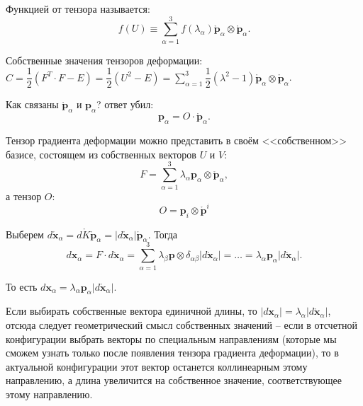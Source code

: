 \begin{definition}
  Функцией от тензора называется:
  \[
    f(U) \equiv \sum_{\alpha=1}^3 f(\lambda_\alpha) \mathring{\mathbf{p}}_\alpha \otimes \mathring{\mathbf{p}}_\alpha.
  \]
\end{definition}


Собственные значения тензоров деформации:
$C = \dfrac{1}{2} (F^T \cdot F - E) = \dfrac{1}{2} \left( U^2 - E \right) = \sum_{\alpha=1}^3 \dfrac{1}{2} (\lambda^2 - 1) \mathring{\mathbf{p}}_\alpha \otimes \mathring{\mathbf{p}}_\alpha$.

\begin{corollary}
  Как связаны $\mathring{\mathbf{p}}_\alpha$ и $\mathbf{p}_\alpha$? ответ убил:
  \[
    \mathbf{p}_\alpha = O \cdot \mathring{\mathbf{p}}_\alpha.
  \]

\end{corollary}

Тензор градиента деформации можно представить в своём <<собственном>> базисе, состоящем из
собственных векторов $U$ и $V$:
\[
  F = \sum_{\alpha=1}^3 \lambda_{\alpha} \mathbf{p}_\alpha \otimes \mathring{\mathbf{p}}_\alpha,
\]
а тензор $O$:
\[
  O = \mathbf{p}_i \otimes \mathring{\mathbf{p}}^i
\]

\begin{corollary}
  Выберем $d\mathring{\mathbf{x}}_\alpha = d\mathring{K} \mathring{\mathbf{p}}_\alpha = |d\mathring{\mathbf{x}}_\alpha| \mathring{\mathbf{p}}_\alpha$. Тогда
  \[
    d\mathbf{x}_\alpha = F \cdot d\mathring{\mathbf{x}}_\alpha = \sum_{\alpha=1}^3 \lambda_\beta \mathbf{p} \otimes \delta_{\alpha\beta} |d\mathring{\mathbf{x}}_\alpha| = \dots = \lambda_\alpha \mathbf{p}_\alpha |d\mathring{\mathbf{x}}_\alpha|.
  \]

  То есть $d\mathbf{x}_\alpha = \lambda_\alpha \mathbf{p}_\alpha |d\mathring{\mathbf{x}}_\alpha|$.

  Если выбирать собственные вектора единичной длины, то $|d\mathbf{x}_\alpha| = \lambda_\alpha |d\mathring{\mathbf{x}}_\alpha|$, отсюда следует геометрический смысл собственных значений -- 
  если в отсчетной конфигурации выбрать векторы по специальным направлениям  (которые мы сможем узнать только после появления тензора градиента деформации), то в актуальной конфигурации этот вектор останется коллинеарным этому направлению, а длина увеличится на собственное значение, соответствующее этому направлению.
\end{corollary}

